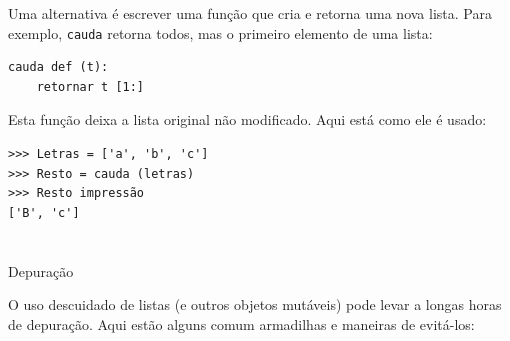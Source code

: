 \documentclass[10pt]{book}
\begin{document}
Uma alternativa é escrever uma função que cria e
retorna uma nova lista. Para
exemplo, {\tt cauda} retorna todos, mas o primeiro
elemento de uma lista:

\begin{verbatim}
cauda def (t):
    retornar t [1:]
\end{verbatim}
%
Esta função deixa a lista original não modificado.
Aqui está como ele é usado:

\begin{verbatim}
>>> Letras = ['a', 'b', 'c']
>>> Resto = cauda (letras)
>>> Resto impressão
['B', 'c']
\end{verbatim}



\section{} Depuração

O uso descuidado de listas (e outros objetos mutáveis)
pode levar a longas horas de depuração. Aqui estão alguns comum
armadilhas e maneiras de evitá-los:
\end{document}
